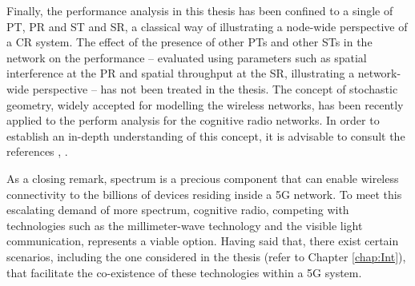 Finally, the performance analysis in this thesis has been confined to a single of PT, PR and ST and SR, a classical way of illustrating a node-wide perspective of a CR system. The effect of the presence of other PTs and other STs in the network on the performance -- evaluated using parameters such as spatial interference at the PR and spatial throughput at the SR, illustrating a network-wide perspective -- has not been treated in the thesis. The concept of stochastic geometry, widely accepted for modelling the wireless networks, has been recently applied to the perform analysis for the cognitive radio networks. In order to establish an in-depth understanding of this concept, it is advisable to consult the references \cite{Ghasemi08, Lee12, Kusal12, Kusal13, Elsawy13, Song14}, . 

As a closing remark, spectrum is a precious component that can enable wireless connectivity to the billions of devices residing inside a 5G network. To meet this escalating demand of more spectrum, cognitive radio, competing with technologies such as the millimeter-wave technology and the visible light communication, represents a viable option. Having said that, there exist certain scenarios, including the one considered in the thesis (refer to Chapter \ref{chap:Int}), that facilitate the co-existence of these technologies within a 5G system. 







